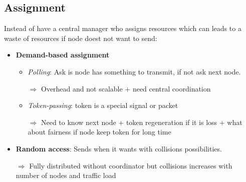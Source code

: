\subsection{Assignment}

Instead of have a central manager who assigns resources which can leads
to a waste of resources if node doest not want to send:
\begin{itemize}
    \item \textbf{Demand-based assignment}
        \begin{itemize}
            \item \textit{Polling}: Ask is node has something to
                transmit, if not ask next node.

                $\Rightarrow$ Overhead and not scalable + need
                central coordination

            \item \textit{Token-passing}: token is a special signal
                or packet

                $\Rightarrow$ Need to know next node + token
                regeneration if it is loss + what about fairness if
                node keep token for long time
        \end{itemize}

    \item \textbf{Random access}: Sends when it wants with
        collisions possibilities.

        $\Rightarrow$ Fully distributed without coordinator
        but collisions increases with number of nodes and
        traffic load
\end{itemize}


